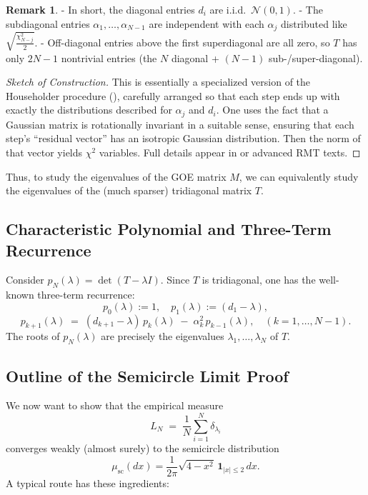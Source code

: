 \documentclass[letterpaper,11pt,oneside,reqno]{article}
\numberwithin{equation}{section}
\theoremstyle{definition}
\newtheorem{remark}[proposition]{Remark}
\begin{document}
\begin{remark}
- In short, the diagonal entries \(d_i\) are i.i.d.\ \(\mathcal{N}(0,1)\).
- The subdiagonal entries \(\alpha_1,\dots,\alpha_{N-1}\) are independent with each \(\alpha_j\) distributed like \(\sqrt{\tfrac{\chi^2_{N-j}}{2}}\).
- Off-diagonal entries above the first superdiagonal are all zero, so \(T\) has only \(2N-1\) nontrivial entries (the \(N\) diagonal + \((N-1)\) sub-/super-diagonal).
\end{remark}

\begin{proof}[Sketch of Construction]
This is essentially a specialized version of the Householder procedure (), carefully arranged so that each step ends up with exactly the distributions described for \(\alpha_j\) and \(d_i\). One uses the fact that a Gaussian matrix is rotationally invariant in a suitable sense, ensuring that each step’s “residual vector” has an isotropic Gaussian distribution.  Then the norm of that vector yields \(\chi^2\) variables.  Full details appear in \cite{DumitriuEdelman2002} or advanced RMT texts.
\end{proof}

Thus, to study the eigenvalues of the GOE matrix \(M\), we can equivalently study the eigenvalues of the (much sparser) tridiagonal matrix \(T\).

\subsection{Characteristic Polynomial and Three-Term Recurrence}

Consider \(p_N(\lambda) = \det(T - \lambda I)\).  Since \(T\) is tridiagonal, one has the well-known three-term recurrence:
\[
  p_0(\lambda) := 1,\quad
  p_1(\lambda) := (d_1 - \lambda),
\]
\[
  p_{k+1}(\lambda)
  \;=\;
  (d_{k+1} - \lambda)\,p_k(\lambda)
  \;-\;\alpha_k^2\,p_{k-1}(\lambda),
  \quad
  (k=1,\dots,N-1).
\]
The roots of \(p_N(\lambda)\) are precisely the eigenvalues \(\lambda_1,\dots,\lambda_N\) of \(T\).

\subsection{Outline of the Semicircle Limit Proof}

We now want to show that the empirical measure
\[
  L_N
  \;=\;
  \frac{1}{N}\sum_{i=1}^N \delta_{\lambda_i}
\]
converges weakly (almost surely) to the semicircle distribution
\[
  \mu_{\mathrm{sc}}(dx)
  = \frac{1}{2\pi} \sqrt{4 - x^2}\,\mathbf{1}_{|x|\le 2}\,dx.
\]
A typical route has these ingredients:
\end{document}
